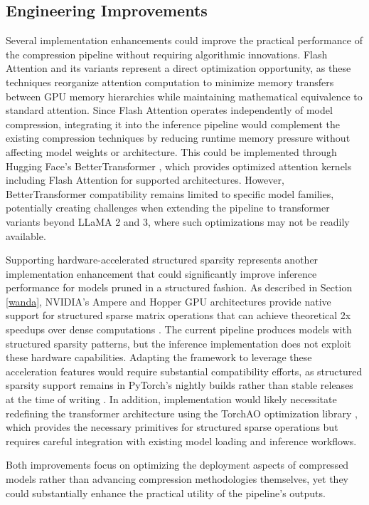 \subsection{Engineering Improvements} \label{sec:future_work_engineering}
Several implementation enhancements could improve the practical performance of the compression pipeline without requiring algorithmic innovations. Flash Attention \cite{flash_attention} and its variants represent a direct optimization opportunity, as these techniques reorganize attention computation to minimize memory transfers between GPU memory hierarchies while maintaining mathematical equivalence to standard attention. Since Flash Attention operates independently of model compression, integrating it into the inference pipeline would complement the existing compression techniques by reducing runtime memory pressure without affecting model weights or architecture. This could be implemented through Hugging Face's BetterTransformer \cite{bettertransformer}, which provides optimized attention kernels including Flash Attention for supported architectures. However, BetterTransformer compatibility remains limited to specific model families, potentially creating challenges when extending the pipeline to transformer variants beyond LLaMA 2 and 3, where such optimizations may not be readily available.

Supporting hardware-accelerated structured sparsity represents another implementation enhancement that could significantly improve inference performance for models pruned in a structured fashion. As described in Section \ref{wanda}, NVIDIA's Ampere and Hopper GPU architectures provide native support for structured sparse matrix operations that can achieve theoretical 2x speedups over dense computations \cite{nvidia-width}. The current pipeline produces models with structured sparsity patterns, but the inference implementation does not exploit these hardware capabilities. Adapting the framework to leverage these acceleration features would require substantial compatibility efforts, as structured sparsity support remains in PyTorch's nightly builds rather than stable releases at the time of writing \cite{pytorch_sparsity}. In addition, implementation would likely necessitate redefining the transformer architecture using the TorchAO optimization library \cite{torchao}, which provides the necessary primitives for structured sparse operations but requires careful integration with existing model loading and inference workflows.

Both improvements focus on optimizing the deployment aspects of compressed models rather than advancing compression methodologies themselves, yet they could substantially enhance the practical utility of the pipeline's outputs.
